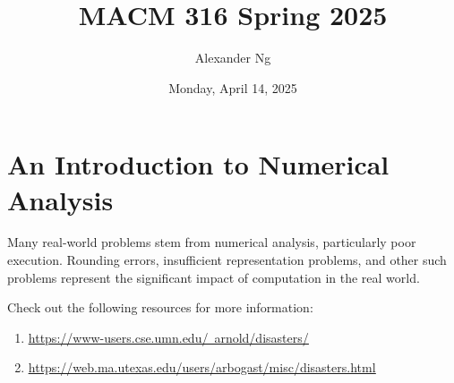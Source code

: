 \documentclass[12pt]{book}
\newcommand{\ulhref}[2]{\href{#1}{\color{blue}\uline{#2}}}
\begin{document}
\title{MACM 316 Spring 2025}
\author{Alexander Ng}
\date{Monday, April 14, 2025}

\maketitle
\tableofcontents
\clearpage



\chapter{An Introduction to Numerical Analysis}
Many real-world problems stem from numerical analysis, particularly poor 
execution. Rounding errors, insufficient representation problems, and other 
such problems represent the significant impact of computation in the real world.

Check out the following resources for more information:
\begin{enumerate}
  \item \ulhref{https://www-users.cse.umn.edu/~arnold/disasters/}{https://www-users.cse.umn.edu/~arnold/disasters/}
  \item \ulhref{https://web.ma.utexas.edu/users/arbogast/misc/disasters.html}{https://web.ma.utexas.edu/users/arbogast/misc/disasters.html}
\end{enumerate}








































\end{document}
